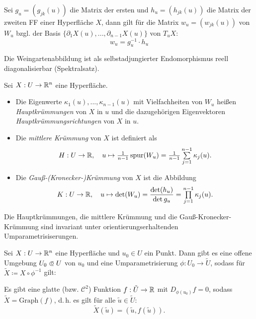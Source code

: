 \documentclass{cheat-sheet}
\newcommand{\spur}{\mathrm{spur}}
\newcommand{\Graph}{\mathrm{Graph}}
\begin{document}
\begin{satz}
  Sei $g_u = (g_{jk}(u))$ die Matrix der ersten und $h_u = (h_{jk}(u))$ die Matrix der zweiten FF einer Hyperfläche $X$, dann gilt für die Matrix $w_u = (w_{jk}(u))$ von $W_u$ bzgl. der Basis $\{ \partial_1 X(u), ..., \partial_{n-1} X(u) \}$ von $T_u X$:
  \[ w_u = g_u^{-1} \cdot h_u \]
\end{satz}

\begin{bem}
  Die Weingartenabbildung ist als selbstadjungierter Endomorphismus reell diagonalisierbar (Spektralsatz).
\end{bem}

\begin{defn}
  Sei $X : U \to \mathbb{R}^n$ eine Hyperfläche.
  \begin{itemize}
    \item Die Eigenwerte $\kappa_1(u), ..., \kappa_{n-1}(u)$ mit Vielfachheiten von $W_u$ heißen \emph{Hauptkrümmungen} von $X$ in $u$ und die dazugehörigen Eigenvektoren \emph{Hauptkrümmungsrichtungen} von $X$ in $u$.
    \item Die \emph{mittlere Krümmung} von $X$ ist definiert als
    \[ H : U \to \R, \quad u \mapsto \tfrac{1}{n-1} \, \spur(W_u) = \tfrac{1}{n-1} \sum_{j=1}^{n-1} \kappa_j(u). \]
    \item Die \emph{Gauß-(Kronecker-)Krümmung} von $X$ ist die Abbildung
    \[ K : U \to \R, \quad u \mapsto \det(W_u) = \frac{\det(h_u)}{\det{g_u}} = \prod_{j=1}^{n-1} \kappa_j(u). \]
  \end{itemize}
\end{defn}

\begin{satz}
  Die Hauptkrümmungen, die mittlere Krümmung und die Gauß-Kronecker-Krümmung sind invariant unter orientierungserhaltenden Umparametrisiserungen.
\end{satz}


\begin{satz}
  Sei $X : U \to \mathbb{R}^n$ eine Hyperfläche und $u_0 \in U$ ein Punkt. Dann gibt es eine offene Umgebung $U_0 \opn U$ von $u_0$ und eine Umparametrisierung $\phi : U_0 \to \tilde{U}$, sodass für $\tilde{X} \coloneqq X \circ \phi^{-1}$ gilt:

  Es gibt eine glatte (bzw. $\mathcal{C}^2$) Funktion $f : \tilde{U} \to \mathbb{R}$ mit $D_{\phi(u_0)} f = 0$, sodass $\tilde{X} = \Graph(f)$, d.\,h. es gilt für alle $\tilde{u} \in \tilde{U}$:
  \[ \tilde{X}(\tilde{u}) = (\tilde{u}, f(\tilde{u})). \]
\end{satz}
\end{document}
